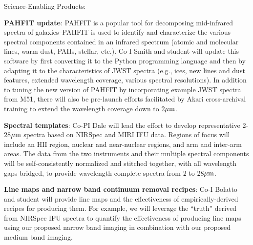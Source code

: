 \documentclass[12pt]{article}
\begin{document}

\analysisplan %

Science-Enabling Products:

{\bf PAHFIT update}: PAHFIT is a popular tool for decomposing mid-infrared spectra of galaxies--PAHFIT is used to identify and characterize the various spectral components contained in an infrared spectrum (atomic and molecular lines, warm dust, PAHs, stellar, etc.).   Co-I Smith and student will update this software by first converting it to the Python programming language and then by adapting it to the characteristics of JWST spectra (e.g., ices, new lines and dust features, extended wavelength coverage, various spectral resolutions).  In addition to tuning the new version of PAHFIT by incorporating example JWST spectra from M51, there will also be pre-launch efforts facilitated by Akari cross-archival training to extend the wavelength coverage down to 2$\hbox{$\mu$m}$. 

{\bf Spectral templates}: Co-PI Dale will lead the effort to develop representative 2-28$\hbox{$\mu$m}$ spectra based on NIRSpec and MIRI IFU data.  Regions of focus will include an HII region, nuclear and near-nuclear regions, and arm and inter-arm areas.  The data from the two instruments and their multiple spectral components will be self-consistently normalized and stitched together, with all wavelength gaps bridged, to provide wavelength-complete spectra from 2 to 28$\hbox{$\mu$m}$.  

{\bf Line maps and narrow band continuum removal recipes}: Co-I Bolatto and student will provide line maps and the effectiveness of empirically-derived recipes for producing them.  For example, we will leverage the ``truth'' derived from NIRSpec IFU spectra to quantify the effectiveness of producing line maps using our proposed narrow band imaging in combination with our proposed medium band imaging.  
\end{document}
